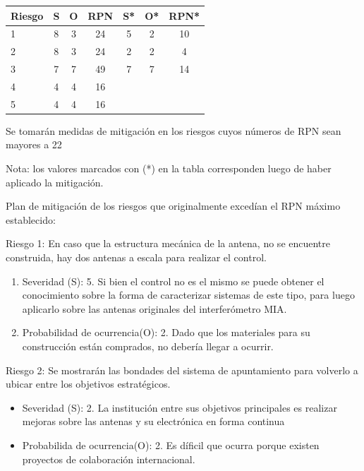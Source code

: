 \documentclass[11pt, %
codirector, %
]{charter}
\begin{document}
\begin{table}[htpb]
\centering
\begin{tabularx}{\linewidth}{@{}|X|c|c|c|c|c|c|@{}}
\hline
\rowcolor[HTML]{C0C0C0} 
Riesgo & S  & O  & RPN & S*  & O*   & RPN* \\ \hline
   1   & 8  & 3  &  24 & 5   & 2    & 10     \\ \hline
   2   & 8  & 3  &  24 & 2   & 2    &  4    \\ \hline
   3   & 7  & 7  &  49 & 7   & 7   &  14   \\ \hline
   4   & 4  & 4  &  16 &    &    &      \\ \hline
   5   & 4  & 4  &  16 &    &    &      \\ \hline
   
\end{tabularx}
\end{table}

Se tomarán medidas de mitigación en los riesgos cuyos números de RPN sean mayores a 22 



Nota: los valores marcados con (*) en la tabla corresponden luego de haber aplicado la mitigación.

Plan de mitigación de los riesgos que originalmente excedían el RPN máximo establecido:
 
Riesgo 1: En caso que la estructura mecánica de la antena, no se encuentre construida, hay dos antenas a escala para realizar el control. 
\begin{enumerate}
	\item Severidad (S): 5. \newline
	Si bien el control no es el mismo se puede obtener el conocimiento sobre la forma de caracterizar sistemas de este tipo, para luego aplicarlo sobre las antenas originales del interferómetro MIA.   
	\item Probabilidad de ocurrencia(O): 2.\newline 
	Dado que los materiales para su construcción están comprados, no debería llegar a ocurrir. 
	
\end{enumerate} 

Riesgo 2: Se mostrarán las bondades del sistema de apuntamiento para volverlo a ubicar entre los objetivos estratégicos. 
\begin{itemize}
	\item Severidad (S): 2. \newline
	La institución entre sus objetivos principales es realizar mejoras sobre las antenas y su electrónica en forma continua 
	\item Probabilida de ocurrencia(O): 2. 
	Es díficil que ocurra porque existen proyectos de colaboración internacional. 
\end{itemize}
\end{document}
